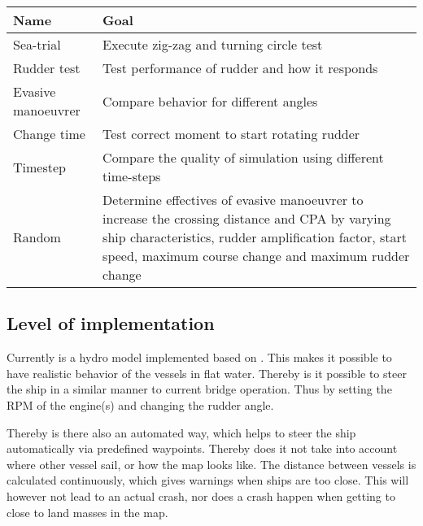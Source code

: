 \begin{table}[p]
	\centering
	\begin{tabular}{p{}|p{}}
		\toprule
		Name & Goal \\
		\midrule
		Sea-trial & Execute zig-zag and turning circle test\\
		Rudder test & Test performance of rudder and how it responds \\
		Evasive manoeuvrer & Compare behavior for different angles \\
		Change time & Test correct moment to start rotating rudder \\
		Timestep & Compare the quality of simulation using different time-steps \\
		Random & Determine effectives of evasive manoeuvrer to increase the crossing distance and CPA by varying ship characteristics, rudder amplification factor, start speed, maximum course change and maximum rudder change \\
		\bottomrule
	\end{tabular}
	
	\label{tab:manoeuvring-tests}
\end{table}


\subsection{Level of implementation}
Currently is a hydro model implemented based on \cite{Artyszuk2016}. This makes it possible to have realistic behavior of the vessels in flat water. Thereby is it possible to steer the ship in a similar manner to current bridge operation. Thus by setting the RPM of the engine(s) and changing the rudder angle. 

Thereby is there also an automated way, which helps to steer the ship automatically via predefined waypoints. Thereby does it not take into account where other vessel sail, or how the map looks like. The distance between vessels is calculated continuously, which gives warnings when ships are too close. This will however not lead to an actual crash, nor does a crash happen when getting to close to land masses in the map.



